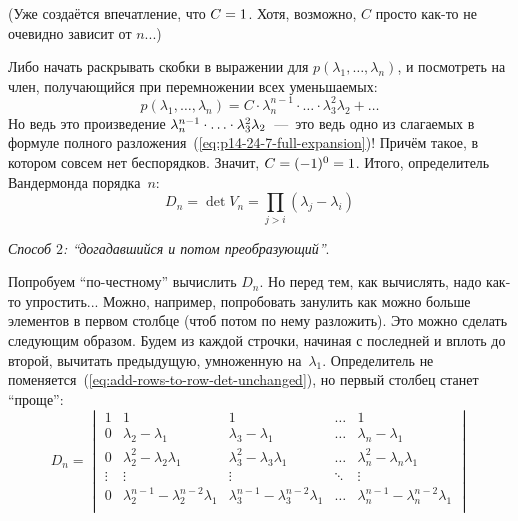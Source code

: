 \documentclass[a4paper,12pt]{article}
\theoremstyle{remark}
\begin{document}
\begin{solution}
    (Уже создаётся впечатление, что $C \hm= 1$.
    Хотя, возможно, $C$ просто как-то не очевидно зависит от $n$...)
    
    Либо начать раскрывать скобки в выражении для $p(\lambda_1, \ldots, \lambda_n)$, и посмотреть на член, получающийся при перемножении всех уменьшаемых:
    \[
      p(\lambda_1, \ldots, \lambda_n) = C \cdot \lambda_n^{n-1} \cdot \ldots \cdot \lambda_3^2 \lambda_2 + \ldots
    \]
    Но ведь это произведение $\lambda_n^{n-1} \hm\cdot \ldots \hm\cdot \lambda_3^2 \lambda_2$~---~это ведь одно из слагаемых в формуле полного разложения~(\ref{eq:p14-24-7-full-expansion})!
    Причём такое, в котором совсем нет беспорядков.
    Значит, $C \hm= (-1)^0 \hm= 1$.
    Итого, определитель Вандермонда порядка~$n$:
    \begin{equation}\label{eq:vander-de-mond}
      D_n = \det V_n = \prod_{j > i} (\lambda_j - \lambda_i)
    \end{equation}
    
    \medskip
    
    \emph{Способ $2$: ``догадавшийся и потом преобразующий''}.
    
    Попробуем ``по-честному'' вычислить $D_n$.
    Но перед тем, как вычислять, надо как-то упростить...
    Можно, например, попробовать занулить как можно больше элементов в первом столбце (чтоб потом по нему разложить).
    Это можно сделать следующим образом.
    Будем из каждой строчки, начиная с последней и вплоть до второй, вычитать предыдущую, умноженную на~$\lambda_1$.
    Определитель не поменяется~(\ref{eq:add-rows-to-row-det-unchanged}), но первый столбец станет ``проще'':
    \[
      D_n
      = \begin{vmatrix}
        1      & 1                                           & 1                                           & \ldots & 1\\
        0      & \lambda_2 - \lambda_1                       & \lambda_3 - \lambda_1                       & \ldots & \lambda_n - \lambda_1\\
        0      & \lambda_2^2 - \lambda_2 \lambda_1           & \lambda_3^2 - \lambda_3 \lambda_1           & \ldots & \lambda_n^2 - \lambda_n \lambda_1\\
        \vdots & \vdots                                      & \vdots                                      & \ddots & \vdots\\
        0      & \lambda_2^{n-1} - \lambda_2^{n-2} \lambda_1 & \lambda_3^{n-1} - \lambda_3^{n-2} \lambda_1 & \ldots & \lambda_n^{n-1} - \lambda_n^{n-2} \lambda_1\\
      \end{vmatrix}
    \]
    

\end{solution}
\end{document}

